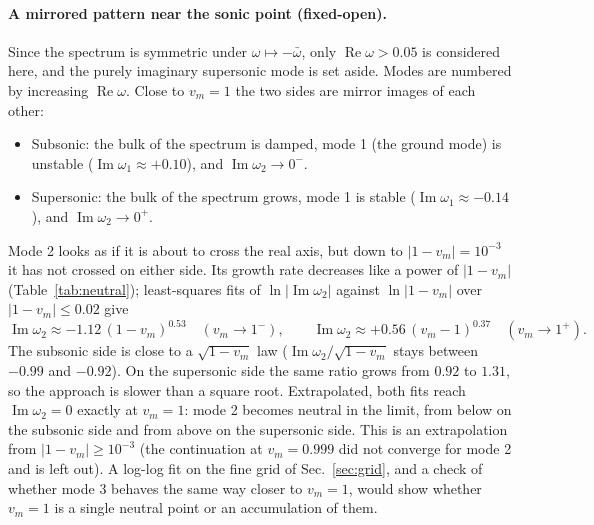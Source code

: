 \documentclass[11pt]{article}
\newcommand{\Real}{\operatorname{Re}}
\newcommand{\Imag}{\operatorname{Im}}
\begin{document}
\paragraph{A mirrored pattern near the sonic point (fixed-open).}\label{sec:neutral} Since the spectrum is
symmetric under $\omega\mapsto-\bar\omega$, only $\Real\omega>0.05$ is considered here, and the purely imaginary
supersonic mode is set aside. Modes are numbered by increasing $\Real\omega$. Close to $v_m=1$ the two sides
are mirror images of each other:
\begin{itemize}
  \item Subsonic: the bulk of the spectrum is damped, mode 1 (the ground mode) is unstable
  ($\Imag\omega_1\approx+0.10$), and $\Imag\omega_2\to0^-$.
  \item Supersonic: the bulk of the spectrum grows, mode 1 is stable ($\Imag\omega_1\approx-0.14$), and
  $\Imag\omega_2\to0^+$.
\end{itemize}
Mode 2 looks as if it is about to cross the real axis, but down to $|1-v_m|=10^{-3}$ it has not crossed on
either side. Its growth rate decreases like a power of $|1-v_m|$ (Table~\ref{tab:neutral}); least-squares fits of
$\ln|\Imag\omega_2|$ against $\ln|1-v_m|$ over $|1-v_m|\le0.02$ give
\begin{equation}
  \Imag\omega_2\approx-1.12\,(1-v_m)^{0.53}\quad(v_m\to1^-),\qquad
  \Imag\omega_2\approx+0.56\,(v_m-1)^{0.37}\quad(v_m\to1^+).
\end{equation}
The subsonic side is close to a $\sqrt{1-v_m}$ law ($\Imag\omega_2/\sqrt{1-v_m}$ stays between $-0.99$ and
$-0.92$). On the supersonic side the same ratio grows from $0.92$ to $1.31$, so the approach is slower than a
square root. Extrapolated, both fits reach $\Imag\omega_2=0$ exactly at $v_m=1$: mode 2 becomes neutral in the
limit, from below on the subsonic side and from above on the supersonic side. This is an extrapolation from
$|1-v_m|\ge10^{-3}$ (the continuation at $v_m=0.999$ did not converge for mode 2 and is left out). A log-log fit on
the fine grid of Sec.~\ref{sec:grid}, and a check of whether mode 3 behaves the same way closer to $v_m=1$, would
show whether $v_m=1$ is a single neutral point or an accumulation of them.
\end{document}
